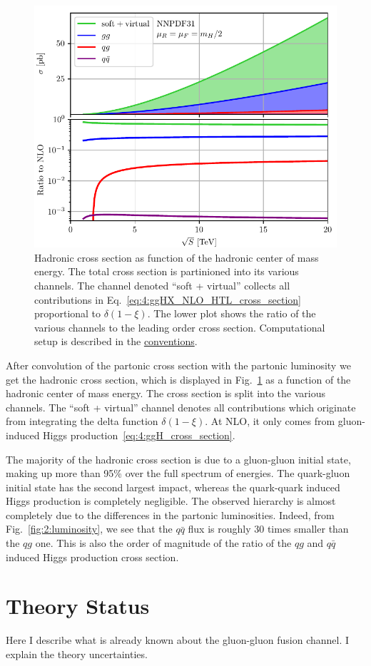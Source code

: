 \begin{figure}[h]
\centering
\includegraphics[width=\figurewidth]{Images/channel_comparison_HTL_NLO.pdf}
\caption{Hadronic cross section as function of the hadronic center of mass energy. The total cross section is partinioned into its various channels. The channel denoted ``soft + virtual'' collects all contributions in Eq.~\eqref{eq:4:ggHX_NLO_HTL_cross_section} proportional to $\delta (1 - \xi)$. The lower plot shows the ratio of the various channels to the leading order cross section. Computational setup is described in the \hyperref[chap:notation_and_conventions]{conventions}.}
\label{fig:4:channel_comparison}
\end{figure}
After convolution of the partonic cross section with the partonic luminosity we get the hadronic cross section, which is displayed in Fig.~\ref{fig:4:channel_comparison} as a function of the hadronic center of mass energy. The cross section is split into the various channels. The ``soft + virtual'' channel denotes all contributions which originate from integrating the delta function $\delta (1 - \xi)$. At \acs{NLO}, it only comes from gluon-induced Higgs production~\eqref{eq:4:ggH_cross_section}.

The majority of the hadronic cross section is due to a gluon-gluon initial state, making up more than 95\% over the full spectrum of energies. The quark-gluon initial state has the second largest impact, whereas the quark-quark induced Higgs production is completely negligible. The observed hierarchy is almost completely due to the differences in the partonic luminosities. Indeed, from Fig.~\ref{fig:2:luminosity}, we see that the $q \bar{q}$ flux is roughly 30 times smaller than the $q g$ one. This is also the order of magnitude of the ratio of the $qg$ and $q \bar{q}$ induced Higgs production cross section.

\section{Theory Status}
Here I describe what is already known about the gluon-gluon fusion channel. I explain the theory uncertainties.

